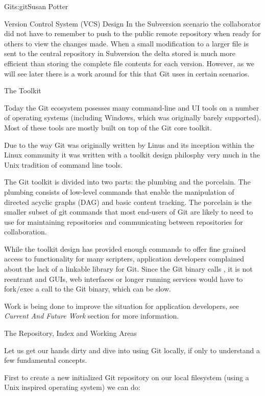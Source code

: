 \begin{aosachapter}{Git}{s:git}{Susan Potter}
\begin{aosasect1}{Version Control System (VCS) Design}
In the Subversion scenario the collaborator did not have to remember
to push to the public remote repository when ready for others to
view the changes made. When a small modification to a larger file is sent
to the central repository in Subversion the delta stored is much more
efficient than storing the complete file contents for each version.
However, as we will see later there is a work around for this that Git
uses in certain scenarios.

\end{aosasect1}

\begin{aosasect1}{The Toolkit}

Today the Git ecosystem posesses many command-line and UI tools on a number
of operating systems (including Windows, which was originally barely
supported). Most of these tools are mostly built on top of the Git core
toolkit.

Due to the way Git was originally written by Linus and its inception within
the Linux community it was written with a toolkit design philosphy very much
in the Unix tradition of command line tools.

The Git toolkit is divided into two parts: the plumbing and
the porcelain. The plumbing consists of low-level commands that enable
the manipulation of directed acyclic graphs (DAG) and basic content
tracking. The porcelain is the smaller subset of git commands that most
end-users of Git are likely to need to use for maintaining repositories and
communicating between repositories for collaboration.

While the toolkit design has provided enough commands to offer fine grained
access to functionality for many scripters, application developers
complained about the lack of a linkable library for Git. Since the Git binary
calls , it is not reentrant and GUIs, web interfaces or longer
running services would have to fork/exec a call to the Git binary, which can
be slow.

Work is being done to improve the situation for application developers, see
\emph{Current And Future Work} section for more information.
\end{aosasect1}

\begin{aosasect1}{The Repository, Index and Working Areas}

Let us get our hands dirty and dive into using Git locally, if only to
understand a few fundamental concepts.

First to create a new initialized Git repository on our local filesystem
(using a Unix inspired operating system) we can do:
\begin{aosaitemize}
  \item {}
  \item {}
  \item {}
\end{aosaitemize}


\end{aosasect1}
\end{aosachapter}
